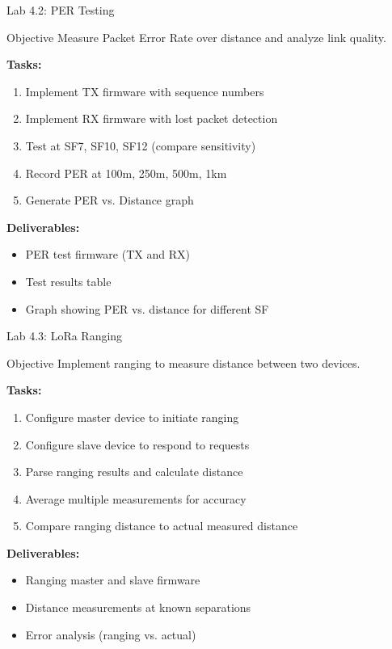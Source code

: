 \documentclass{beamer}
\begin{document}
\begin{frame}{Lab 4.2: PER Testing}
\begin{block}{Objective}
Measure Packet Error Rate over distance and analyze link quality.
\end{block}

\textbf{Tasks:}
\begin{enumerate}
    \item Implement TX firmware with sequence numbers
    \item Implement RX firmware with lost packet detection
    \item Test at SF7, SF10, SF12 (compare sensitivity)
    \item Record PER at 100m, 250m, 500m, 1km
    \item Generate PER vs. Distance graph
\end{enumerate}

\vspace{0.3cm}

\textbf{Deliverables:}
\begin{itemize}
    \item PER test firmware (TX and RX)
    \item Test results table
    \item Graph showing PER vs. distance for different SF
\end{itemize}
\end{frame}

\begin{frame}{Lab 4.3: LoRa Ranging}
\begin{block}{Objective}
Implement ranging to measure distance between two devices.
\end{block}

\textbf{Tasks:}
\begin{enumerate}
    \item Configure master device to initiate ranging
    \item Configure slave device to respond to requests
    \item Parse ranging results and calculate distance
    \item Average multiple measurements for accuracy
    \item Compare ranging distance to actual measured distance
\end{enumerate}

\vspace{0.3cm}

\textbf{Deliverables:}
\begin{itemize}
    \item Ranging master and slave firmware
    \item Distance measurements at known separations
    \item Error analysis (ranging vs. actual)
\end{itemize}
\end{frame}
\end{document}
